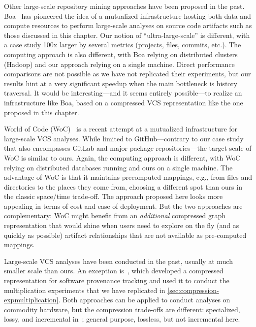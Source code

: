 Other large-scale repository mining approaches have been proposed in the past.
%
Boa~\cite{dyer2013boa} has pioneered the idea of a mutualized infrastructure
hosting both data and compute resources to perform large-scale analyses on
source code artifacts such as those discussed in this chapter. Our notion of
``ultra-large-scale'' is different, with a case study 100x larger by several
metrics (projects, files, commits, etc.). The computing approach is also
different, with Boa relying on distributed clusters (Hadoop) and our approach
relying on a single machine. Direct performance comparisons are not possible as
we have not replicated their experiments, but our results hint at a very
significant speedup when the main bottleneck is history traversal. It would be
interesting---and it seems entirely possible---to realize an infrastructure
like Boa, based on a compressed VCS representation like the one proposed in
this chapter.

World of Code (WoC)~\cite{mockus2019woc} is a recent attempt at a mutualized
infrastructure for large-scale VCS analyses. While limited to GitHub---contrary
to our case study that also encompasses GitLab and major package
repositories---the target scale of WoC is similar to ours. Again, the computing
approach is different, with WoC relying on distributed databases running and
ours on a single machine. The advantage of WoC is that it maintains
precomputed mappings, e.g., from files and directories to the places they come
from, choosing a different spot than ours in the classic space/time trade-off.
The approach proposed here looks more appealing in terms of cost and ease of
deployment. But the two approaches are complementary: WoC might benefit from an
\emph{additional} compressed graph representation that would shine when users
need to explore on the fly (and as quickly as possible) artifact relationships
that are not available as pre-computed mappings.

Large-scale VCS analyses have been conducted in the past, usually at much
smaller scale than ours. An exception is~\cite{swh-provenance-emse}, which
developed a compressed representation for software provenance tracking and used
it to conduct the multiplication experiments that we have replicated in
\cref{sec:compression-expmultiplication}. Both approaches can be applied
to conduct analyses on commodity hardware, but the compression trade-offs are
different: specialized, lossy, and incremental in~\cite{swh-provenance-emse};
general purpose, lossless, but not incremental here.

